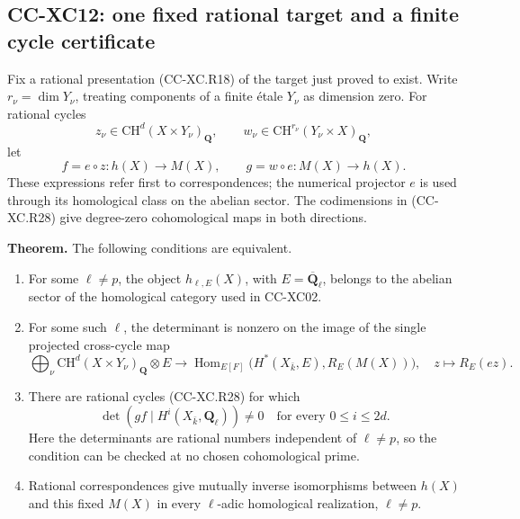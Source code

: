 \subsection{CC-XC12: one fixed rational target and a finite cycle
certificate}\label{cc-xc12-one-fixed-rational-target-and-a-finite-cycle-certificate}

Fix a rational presentation (CC-XC.R18) of the target just proved to
exist. Write \(r_\nu=\dim Y_\nu\), treating components of a finite étale
\(Y_\nu\) as dimension zero. For rational cycles \[
 z_\nu\in\mathrm{CH}^d(X\times Y_\nu)_{\mathbf Q},\qquad
 w_\nu\in\mathrm{CH}^{r_\nu}(Y_\nu\times X)_{\mathbf Q},
                                                        \tag{CC-XC.R28}
\] let \[
 f=e\circ z:h(X)\longrightarrow M(X),\qquad
 g=w\circ e:M(X)\longrightarrow h(X).
                                                        \tag{CC-XC.R29}
\] These expressions refer first to correspondences; the numerical
projector \(e\) is used through its homological class on the abelian
sector. The codimensions in (CC-XC.R28) give degree-zero cohomological
maps in both directions.

\textbf{Theorem.} The following conditions are equivalent.

\begin{enumerate}
\def\labelenumi{\arabic{enumi}.}
\tightlist
\item
  For some \(\ell\ne p\), the object \(h_{\ell,E}(X)\), with
  \(E=\overline{\mathbf Q}_\ell\), belongs to the abelian sector of the
  homological category used in CC-XC02.
\item
  For some such \(\ell\), the determinant is nonzero on the image of the
  single projected cross-cycle map \[
  \bigoplus_\nu
      \mathrm{CH}^d(X\times Y_\nu)_{\mathbf Q}\otimes E
    \longrightarrow
      \operatorname{Hom}_{E[F]}
      \bigl(H^*(X_{\bar k},E),R_E(M(X))\bigr),\quad
        z\longmapsto R_E(ez).
                                                       \tag{CC-XC.R30}
  \]
\item
  There are rational cycles (CC-XC.R28) for which \[
      \det(gf\mid H^i(X_{\bar k},\mathbf Q_\ell))\ne0
         \quad\text{for every }0\le i\le2d.
                                                       \tag{CC-XC.R31}
  \] Here the determinants are rational numbers independent of
  \(\ell\ne p\), so the condition can be checked at no chosen
  cohomological prime.
\item
  Rational correspondences give mutually inverse isomorphisms between
  \(h(X)\) and this fixed \(M(X)\) in every \(\ell\)-adic homological
  realization, \(\ell\ne p\).
\end{enumerate}

